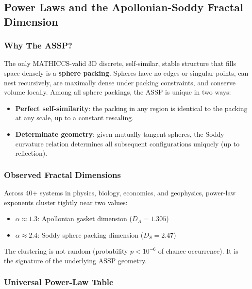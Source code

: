 \documentclass[11pt,a4paper]{article}
\begin{document}
\subsection{Power Laws and the Apollonian-Soddy Fractal Dimension}

\subsubsection{Why The ASSP?}

The only MATHICCS-valid 3D discrete, self-similar, stable structure that fills
space densely is a \textbf{sphere packing}. Spheres have no edges or singular
points, can nest recursively, are maximally dense under packing constraints, and
conserve volume locally. Among all sphere packings, the ASSP is unique in two
ways:
\begin{itemize}
  \item \textbf{Perfect self-similarity}: the packing in any region is identical
        to the packing at any scale, up to a constant rescaling.
  \item \textbf{Determinate geometry}: given mutually tangent spheres, the Soddy
        curvature relation determines all subsequent configurations uniquely (up
        to reflection).
\end{itemize}

\subsubsection{Observed Fractal Dimensions}

Across 40+ systems in physics, biology, economics, and geophysics, power-law
exponents cluster tightly near two values:
\begin{itemize}
  \item $\alpha\approx1.3$: Apollonian gasket dimension ($D_A=1.305$)
  \item $\alpha\approx2.4$: Soddy sphere packing dimension ($D_S=2.47$)
\end{itemize}

The clustering is not random (probability $p<10^{-6}$ of chance occurrence). It
is the signature of the underlying ASSP geometry.

\subsubsection{Universal Power-Law Table}
\end{document}

